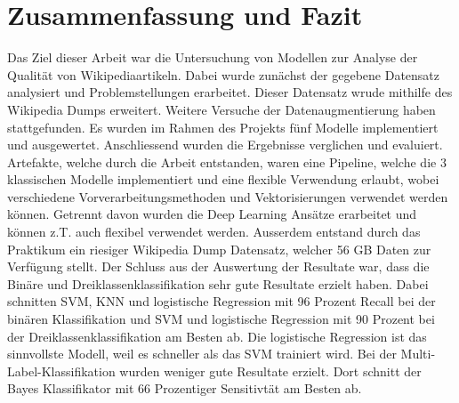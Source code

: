 \section{Zusammenfassung und Fazit}
\label{ZusammenfassungUndFazit}
Das Ziel dieser Arbeit war die Untersuchung von Modellen zur Analyse der Qualität von Wikipediaartikeln. Dabei wurde zunächst der gegebene Datensatz analysiert und Problemstellungen erarbeitet. Dieser Datensatz wrude mithilfe des Wikipedia Dumps erweitert. Weitere Versuche der Datenaugmentierung haben stattgefunden. Es wurden im Rahmen des Projekts fünf Modelle implementiert und ausgewertet. Anschliessend wurden die Ergebnisse verglichen und evaluiert. Artefakte, welche durch die Arbeit entstanden, waren eine Pipeline, welche die 3 klassischen Modelle implementiert und eine flexible Verwendung erlaubt, wobei verschiedene Vorverarbeitungsmethoden und Vektorisierungen verwendet werden können. Getrennt davon wurden die Deep Learning Ansätze erarbeitet und können z.T. auch flexibel verwendet werden. Ausserdem entstand durch das Praktikum ein riesiger Wikipedia Dump Datensatz, welcher 56 GB Daten zur Verfügung stellt.
Der Schluss aus der Auswertung der Resultate war, dass die Binäre und Dreiklassenklassifikation sehr gute Resultate erzielt haben. Dabei schnitten SVM, KNN und logistische Regression mit 96 Prozent Recall bei der binären Klassifikation und SVM und logistische Regression mit 90 Prozent bei der Dreiklassenklassifikation am Besten ab. Die logistische Regression ist das sinnvollste Modell, weil es schneller als das SVM trainiert wird. Bei der Multi-Label-Klassifikation wurden weniger gute Resultate erzielt. Dort schnitt der Bayes Klassifikator mit 66 Prozentiger Sensitivtät am Besten ab.
